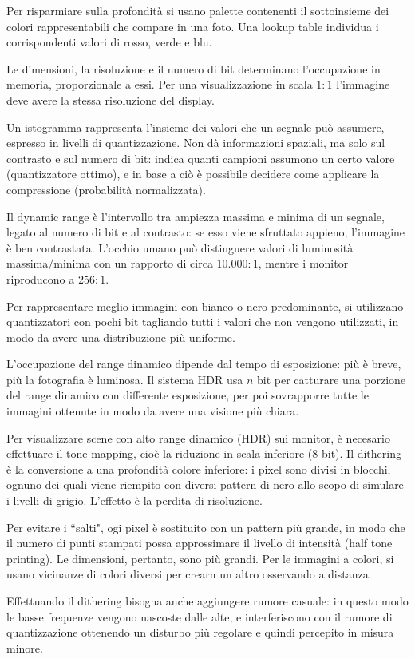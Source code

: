 Per risparmiare sulla profondità si usano palette contenenti il sottoinsieme dei colori rappresentabili che compare in una foto. Una lookup table individua i corrispondenti valori di rosso, verde e blu.

Le dimensioni, la risoluzione e il numero di bit determinano l'occupazione in memoria, proporzionale a essi. Per una visualizzazione in scala $1 : 1$ l'immagine deve avere la stessa risoluzione del display.

Un istogramma rappresenta l'insieme dei valori che un segnale può assumere, espresso in livelli di quantizzazione. Non dà informazioni spaziali, ma solo sul contrasto e sul numero di bit: indica quanti campioni assumono un certo valore (quantizzatore ottimo), e in base a ciò è possibile decidere come applicare la compressione (probabilità normalizzata).

Il dynamic range è l'intervallo tra ampiezza massima e minima di un segnale, legato al numero di bit e al contrasto: se esso viene sfruttato appieno, l'immagine è ben contrastata. L'occhio umano può distinguere valori di luminosità massima/minima con un rapporto di circa $10.000 : 1$, mentre i monitor riproducono a $256 : 1$.

Per rappresentare meglio immagini con bianco o nero predominante, si utilizzano quantizzatori con pochi bit tagliando tutti i valori che non vengono utilizzati, in modo da avere una distribuzione più uniforme. 

L'occupazione del range dinamico dipende dal tempo di esposizione: più è breve, più la fotografia è luminosa. Il sistema HDR usa $n$ bit per catturare una porzione del range dinamico con differente esposizione, per poi sovrapporre tutte le immagini ottenute in modo da avere una visione più chiara. 

Per visualizzare scene con alto range dinamico (HDR) sui monitor, è necesario effettuare il tone mapping, cioè la riduzione in scala inferiore (8 bit). Il dithering è la conversione a una profondità colore inferiore: i pixel sono divisi in blocchi, ognuno dei quali viene riempito con diversi pattern di nero allo scopo di simulare i livelli di grigio. L'effetto è la perdita di risoluzione.

Per evitare i ``salti", ogi pixel è sostituito con un pattern più grande, in modo che il numero di punti stampati possa approssimare il livello di intensità (half tone printing). Le dimensioni, pertanto, sono più grandi. Per le immagini a colori, si usano vicinanze di colori diversi per crearn un altro osservando a distanza. 

Effettuando il dithering bisogna anche aggiungere rumore casuale: in questo modo le basse frequenze vengono nascoste dalle alte, e interferiscono con il rumore di quantizzazione ottenendo un disturbo più regolare e quindi percepito in misura minore.








